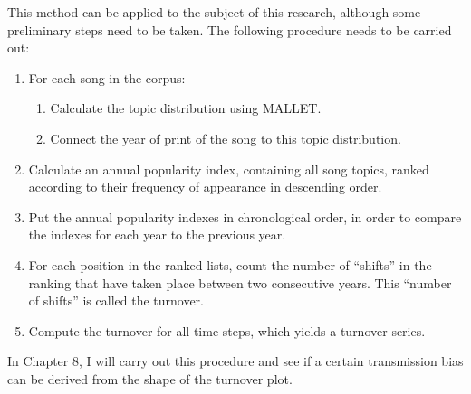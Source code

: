 \noindent This method can be applied to the subject of this research, although some preliminary steps need to be taken. The following procedure needs to be carried out:

\begin{enumerate}
	\item For each song in the corpus:
	\begin{enumerate}
		\item Calculate the topic distribution using MALLET.
		\item Connect the year of print of the song to this topic distribution.
	\end{enumerate}
	\item Calculate an annual popularity index, containing all song topics, ranked according to their frequency of appearance in descending order.
	\item Put the annual popularity indexes in chronological order, in order to compare the indexes for each year to the previous year.
	\item For each position in the ranked lists, count the number of \enquote{shifts} in the ranking that have taken place between two consecutive years. This \enquote{number of shifts} is called the turnover.
	\item Compute the turnover for all time steps, which yields a turnover series.
\end{enumerate}

\noindent In Chapter 8, I will carry out this procedure and see if a certain transmission bias can be derived from the shape of the turnover plot.